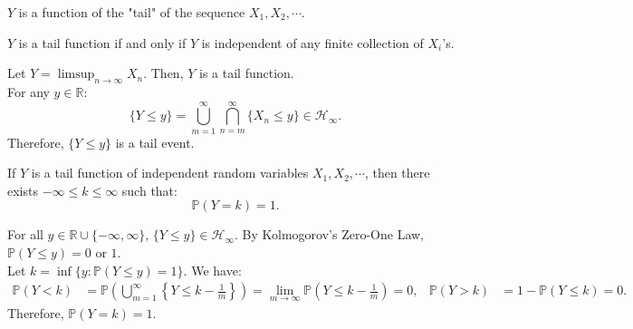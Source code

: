 \documentclass{huhtakm-template-book-v2}
\newcommand{\prob}{\mathbb{P}}
\begin{document}
    \begin{rem}
        $Y$ is a function of the "tail" of the sequence $X_{1},X_{2},\cdots$.
    \end{rem}
    \begin{rem}
        $Y$ is a tail function if and only if $Y$ is independent of any finite collection of $X_{i}$'s.
    \end{rem}
    \begin{eg}
        Let $Y = \limsup_{n \to \infty}X_{n}$. Then, $Y$ is a tail function.\\
        For any $y \in \mathbb{R}$:
        \begin{equation*}
            \{Y \leq y\} = \bigcup_{m = 1}^{\infty}\bigcap_{n = m}^{\infty}\{X_{n} \leq y\} \in \mathcal{H}_{\infty}.
        \end{equation*}
        Therefore, $\{Y \leq y\}$ is a tail event.
    \end{eg}
    \begin{thm}
        \label{Chapter 8 (Theorem) Probability of Tail Function is 0 or 1 in a Single Value}
        If $Y$ is a tail function of independent random variables $X_{1},X_{2},\cdots$, then there exists $-\infty \leq k \leq \infty$ such that:
        \begin{equation*}
            \prob(Y = k) = 1.
        \end{equation*}
    \end{thm}
    \begin{proofing}
        For all $y \in \mathbb{R}\cup\{-\infty,\infty\}$, $\{Y \leq y\} \in \mathcal{H}_{\infty}$. By Kolmogorov's Zero-One Law, $\prob(Y \leq y) = 0$ or $1$.\\
        Let $k = \inf\{y:\prob(Y \leq y) = 1\}$. We have:
        \begin{align*}
            \prob(Y < k) &= \prob\left(\bigcup_{m = 1}^{\infty}\left\{Y \leq k-\frac{1}{m}\right\}\right) = \lim_{m \to \infty}\prob\left(Y \leq k-\frac{1}{m}\right) = 0, & \prob(Y > k) &= 1-\prob(Y \leq k) = 0.
        \end{align*}
        Therefore, $\prob(Y = k) = 1$.
    \end{proofing}
    \newpage
\end{document}
